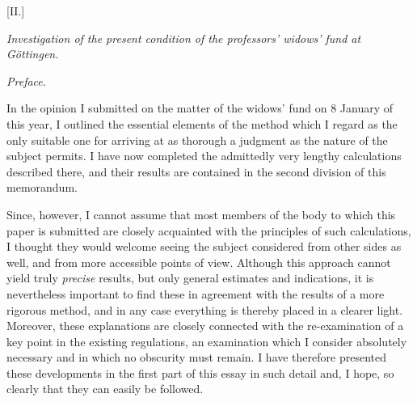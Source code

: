 \begin{center}
{\large [II.]\par}\medskip
\textit{Investigation of the present condition of the professors' widows' fund at Göttingen.}\par\medskip
\textit{Preface.}\par
\end{center}
\noindent\hspace*{\parindent}In the opinion I submitted on the matter of the widows' fund on 8 January of this year, I outlined the essential elements of the method which I regard as the only suitable one for arriving at as thorough a judgment as the nature of the subject permits. I have now completed the admittedly very lengthy calculations described there, and their results are contained in the second division of this memorandum.

Since, however, I cannot assume that most members of the body to which this paper is submitted are closely acquainted with the principles of such calculations, I thought they would welcome seeing the subject considered from other sides as well, and from more accessible points of view. Although this approach cannot yield truly \textit{precise}
results, but only general estimates and indications, it is nevertheless important to find these in agreement with the results of a more rigorous method, and in any case everything is thereby placed in a clearer light. Moreover, these explanations are closely connected with the re-examination of a key point in the existing regulations, an examination which I consider absolutely necessary and in which no obscurity must remain. I have therefore presented these developments in the first part of this essay in such detail and, I hope, so clearly that they can easily be followed.

